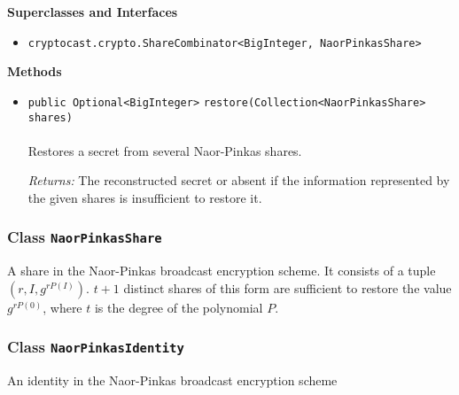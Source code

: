 \textbf{\sffamily Superclasses and Interfaces}
\begin{itemize}
\item \lstinline|cryptocast.crypto.ShareCombinator<BigInteger, NaorPinkasShare>|
\end{itemize}



\textbf{\sffamily Methods}
\begin{itemize}
\item \lstinline|public Optional<BigInteger>| \lstinline|restore|\lstinline|(Collection<NaorPinkasShare> shares)|\\ \\[-0.6em]
Restores a secret from several Naor-Pinkas shares.

\emph{Returns:} The reconstructed secret or absent if the information represented
 by the given shares is insufficient to restore it.

\end{itemize}

\subsubsection{Class \lstinline|NaorPinkasShare|}
A share in the Naor-Pinkas broadcast encryption scheme. It consists of a tuple
 $(r, I, g^{r P(I)})$. $t + 1$ distinct shares of this form are sufficient to restore the
 value $g^{r P(0)}$, where $t$ is the degree of the polynomial $P$. \\
\noindent\begin{minipage}[t]{5cm}
\vspace{0.3em}
\hspace*{2em}
\vspace{0.3em}
\end{minipage}





\subsubsection{Class \lstinline|NaorPinkasIdentity|}
An identity in the Naor-Pinkas broadcast encryption scheme \\
\noindent\begin{minipage}[t]{5cm}
\vspace{0.3em}
\hspace*{2em}
\vspace{0.3em}
\end{minipage}




